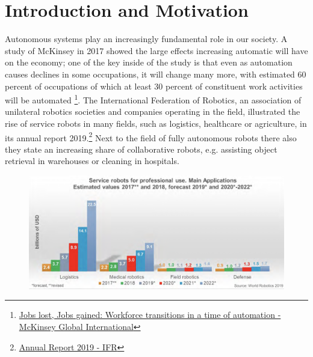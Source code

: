 \chapter{Introduction and Motivation}
\label{text:introduction}
Autonomous systems play an increasingly fundamental role in our society. A study of McKinsey in 2017 showed the large effects increasing automatic will have on the economy; one of the key inside of the study is that even as automation causes declines in some occupations, it will change many more, with estimated 60 percent of occupations of which at least 30 percent of constituent work activities will be automated \footnote{\href{https://www.mckinsey.com/~/media/McKinsey/Featured\%20Insights/Future\%20of\%20Organizations/What\%20the\%20future\%20of\%20work\%20will\%20mean\%20for\%20jobs\%20skills\%20and\%20wages/MGI-Jobs-Lost-Jobs-Gained-Report-December-6-2017.ashx}{Jobs lost, Jobs gained: Workforce transitions in a time of automation - McKinsey Global International}}. The International Federation of Robotics, an association of unilateral robotics societies and companies operating in the field, illustrated the rise of service robots in many fields, such as logistics, healthcare or agriculture, in its annual report 2019.\footnote{\href{https://ifr.org/downloads/press2018/IFR\%20World\%20Robotics\%20Presentation\%20-\%2018\%20Sept\%202019.pdf}{Annual Report 2019 - IFR}} Next to the field of fully autonomous robots there also they state an increasing share of collaborative robots, e.g. assisting object retrieval in warehouses or cleaning in hospitals.

\begin{figure}[!ht]
\begin{center}
\includegraphics[width=\imgwidth]{images/service_robotics.png}
\label{img:service_robotics}
\end{center}
\end{figure}

